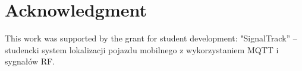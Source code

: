 \documentclass[conference,a4paper]{IEEEtran}
\begin{document}
\section*{Acknowledgment}
This work was supported by the grant for student development: "SignalTrack” – studencki system lokalizacji pojazdu mobilnego z wykorzystaniem MQTT i sygnałów RF.  





%
%
%



\end{document}
